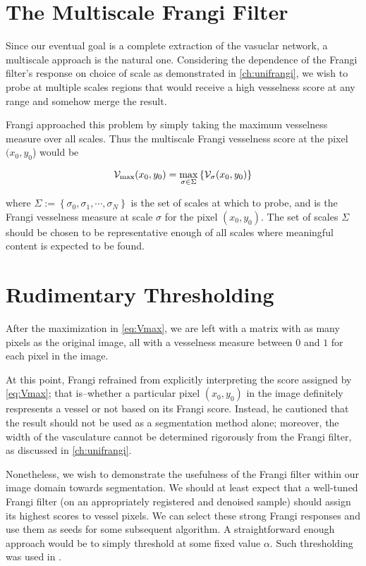     \section{The Multiscale Frangi Filter}
    Since our eventual goal is a complete extraction of the vasuclar network, a multiscale approach is the natural one. Considering the dependence of the Frangi filter's response on choice of scale as demonstrated in \cref{ch:unifrangi}, we wish to probe at multiple scales
   regions that would receive a high vesselness score at any range and somehow merge the result.
   
    Frangi \cite{frangi-paper} approached this problem by simply taking the maximum vesselness measure over all scales. Thus the multiscale Frangi vesselness score at the pixel $(x_0, y_0$) would be 
    
    \begin{equation} \label{eq:Vmax}
    \mathcal{V}_{\max}(x_0, y_0) =
    	\underset{\sigma \in \Sigma}{\max}\left\{  \mathcal{V}_{\sigma} (x_0, y_0) \right\}
    \end{equation}
    
    where $\Sigma := \left\{ \sigma_0, \sigma_1 , \cdots, \sigma_N \right\}$ is
    the set of scales at which to probe, and \Vsigma is the Frangi vesselness measure at scale $\sigma$ for the pixel $(x_0,y_0)$. The set of scales $\Sigma$ should be chosen to be representative enough of all scales where meaningful content is expected to be found.
    
   
    \section{Rudimentary Thresholding}
    
    After the maximization in \cref{eq:Vmax}, we are left with a matrix with as many pixels as the original image, all with a vesselness measure between $0$ and $1$ for each pixel in the image.
         
    At this point, Frangi \cite{frangi-paper} refrained from explicitly interpreting the score assigned by \cref{eq:Vmax}; that is--whether a particular pixel $(x_0,y_0)$ in the image definitely respresents a vessel or not based on its Frangi score. Instead, he cautioned that the result should not be used as a segmentation method alone; moreover, the width of the vasculature cannot be determined rigorously from the Frangi filter, as discussed in \cref{ch:unifrangi}.
   
    Nonetheless, we wish to demonstrate the usefulness of the Frangi filter within our image domain towards segmentation. We should at least expect that a well-tuned Frangi filter (on an appropriately registered and denoised sample) should assign its highest scores to vessel pixels. We can select these strong Frangi responses and use them as seeds for some subsequent algorithm. A straightforward enough approach would be to simply threshold at some fixed value $\alpha$. Such thresholding was used in \cite{huynh2013filter}. 
   

